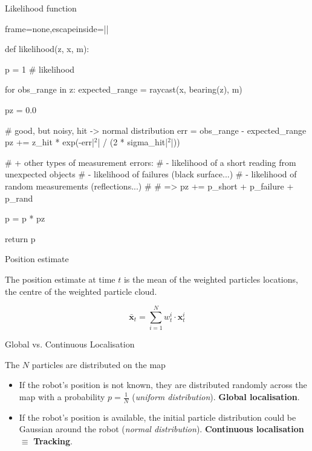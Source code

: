 \documentclass[compress,xcolor=table]{beamer}
\begin{document}

\begin{frame}[fragile]{Likelihood function}

\begin{pythoncode*}{frame=none,escapeinside=||}

def likelihood(z, x, m):

    p = 1 # likelihood

    for obs_range in z:
        expected_range = raycast(x, bearing(z), m)

        pz = 0.0

        # good, but noisy, hit -> normal distribution
        err = obs_range - expected_range
        pz += z_hit * exp(-err|$^2$| / (2 * sigma_hit|$^2$|))

        # + other types of measurement errors:
        #    - likelihood of a short reading from unexpected objects
        #    - likelihood of failures (black surface...)
        #    - likelihood of random measurements (reflections...)
        #
        # => pz += p_short + p_failure + p_rand

        p = p * pz

    return p
\end{pythoncode*}

\end{frame}




\begin{frame}{Position estimate}

    The position estimate at time $t$ is the mean of the weighted particles locations,
    \ie the centre of the weighted particle cloud.

    \Large
    \[
        \bar{\mathbf{x}}_t = \sum^N_{i=1} w^i_t \cdot \mathbf{x}^i_t
    \]
\end{frame}

\begin{frame}{Global vs. Continuous Localisation}

    The $N$ particles are distributed on the map

    \begin{itemize}
        \item If the robot's position is not known, they are distributed randomly
            across the map with a probability $p=\frac{1}{N}$ (\emph{uniform
            distribution}). \textbf{Global localisation}.

        \item If the robot's position is available, the initial particle
            distribution could be Gaussian around the robot (\emph{normal
            distribution}). \textbf{Continuous localisation} $\equiv$
            \textbf{Tracking}.
    \end{itemize}

\end{frame}
\end{document}
